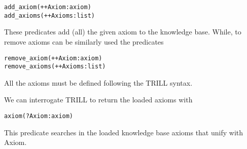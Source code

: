 \begin{verbatim}
add_axiom(++Axiom:axiom)
add_axioms(++Axioms:list)
\end{verbatim}
These predicates add (all) the given axiom to the knowledge base. While, to remove axioms can be similarly used the predicates
\begin{verbatim}
remove_axiom(++Axiom:axiom)
remove_axioms(++Axioms:list)
\end{verbatim}
All the axioms must be defined following the TRILL syntax.

We can interrogate TRILL to return the loaded axioms with
\begin{verbatim}
axiom(?Axiom:axiom)
\end{verbatim}
This predicate searches in the loaded knowledge base axioms that unify with Axiom.
